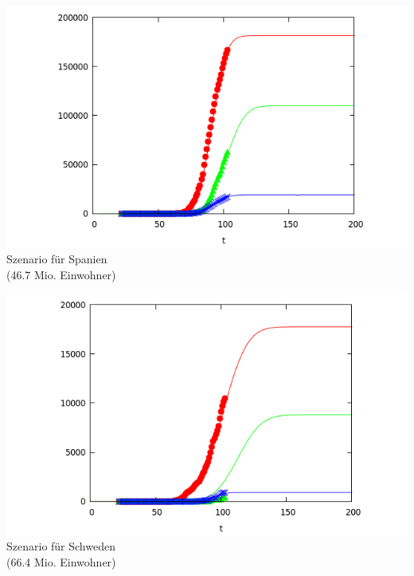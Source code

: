 \documentclass[a4paper,11pt]{article}
\begin{document}
\begin{center}
  \begin{minipage}{.48\textwidth}\centering
  \includegraphics[width=.8\textwidth]{Spain.png}\\[1em]
  {Szenario für Spanien\\ (46.7 Mio. Einwohner)}
  \end{minipage}\hfill
  \begin{minipage}{.48\textwidth}\centering
  \includegraphics[width=.8\textwidth]{Sweden.png}\\[1em]
  {Szenario für Schweden\\ (66.4 Mio. Einwohner)}
  \end{minipage}
  

\end{center}
\end{document}
